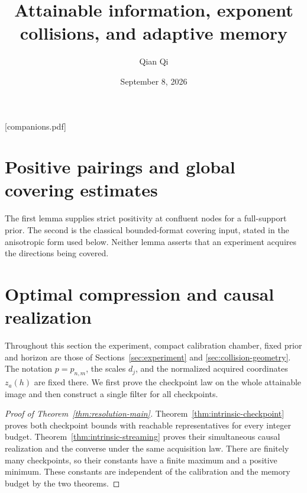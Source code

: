 
\providecommand{\upref}[2]{#1~\ref{#2}}
[companions.pdf]
\title[Attainable information and adaptive memory]{Attainable information, exponent collisions, and adaptive memory}
\author{Qian Qi}
\date{September 8, 2026}

\begin{abstract}

\end{abstract}
\maketitle






\section{Positive pairings and global covering estimates}\label{sec:analytic-inputs}
The first lemma supplies strict positivity at confluent nodes for a
full-support prior. The second is the classical bounded-format
covering input, stated in the anisotropic form used below. Neither
lemma asserts that an experiment acquires the directions being covered.


\section{Optimal compression and causal realization}\label{sec:direct-classification}
Throughout this section the experiment, compact calibration chamber,
fixed prior and horizon are those of Sections~\ref{sec:experiment} and
\ref{sec:collision-geometry}. The notation $p=p_{n,m}$, the scales
$d_j$, and the normalized acquired coordinates $z_a(h)$ are fixed there.
We first prove the checkpoint law on the whole attainable image and
then construct a single filter for all checkpoints.

\begin{proof}[Proof of Theorem~\ref{thm:resolution-main}]
Theorem~\ref{thm:intrinsic-checkpoint} proves both checkpoint bounds
with reachable representatives for every integer budget.
Theorem~\ref{thm:intrinsic-streaming} proves their simultaneous causal
realization and the converse under the same acquisition law. There
are finitely many checkpoints, so their constants have a finite
maximum and a positive minimum. These constants are independent of
the calibration and the memory budget by the two theorems.
\end{proof}
